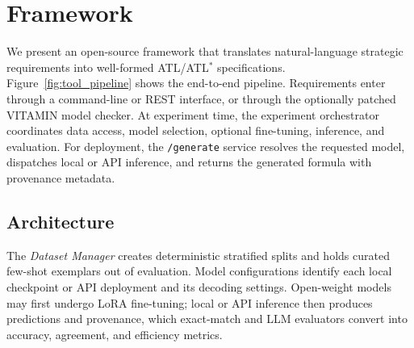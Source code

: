 \section{Framework}
\label{sec:framework}

We present an open-source framework that translates natural-language strategic requirements into well-formed ATL/ATL$^\ast$ specifications. Figure~\ref{fig:tool_pipeline} shows the end-to-end pipeline. Requirements enter through a command-line or REST interface, or through the optionally patched \textsc{VITAMIN} model checker. At experiment time, the experiment orchestrator coordinates data access, model selection, optional fine-tuning, inference, and evaluation. For deployment, the \texttt{/generate} service resolves the requested model, dispatches local or API inference, and returns the generated formula with provenance metadata.

\subsection{Architecture}

The \emph{Dataset Manager} creates deterministic stratified splits and holds curated few-shot exemplars out of evaluation. Model configurations identify each local checkpoint or API deployment and its decoding settings. Open-weight models may first undergo LoRA fine-tuning; local or API inference then produces predictions and provenance, which exact-match and LLM evaluators convert into accuracy, agreement, and efficiency metrics.

